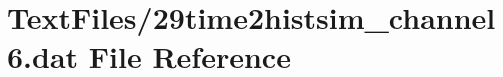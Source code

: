 \hypertarget{29time2histsim__channel6_8dat}{}\section{Text\+Files/29time2histsim\+\_\+channel6.dat File Reference}
\label{29time2histsim__channel6_8dat}
